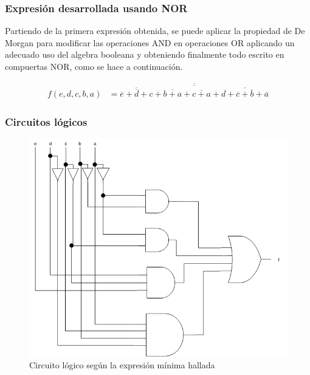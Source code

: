 \subsubsection{Expresión desarrollada usando NOR}
Partiendo de la primera expresi\'on obtenida, se puede aplicar la propiedad de De Morgan para modificar las operaciones AND en operaciones OR
aplicando un adecuado uso del algebra booleana y obteniendo finalmente todo escrito en compuertas NOR,
como se hace a continuaci\'on.

\begin{align*}
f(e,d,c,b,a) & = \overline{
    \overline{
            \overline{\overline{e} + \overline{d} + c}
            + \overline{b + a}
            + \overline{c + a}
            + \overline{d + \overline{c} + \overline{b} + \overline{a}}
            }
    }
\end{align*}

\subsubsection{Circuitos lógicos}

\begin{figure}[H]
    \centering
    \includegraphics[scale=0.5]{EJ_2/resources/ej_2_minterms_0.png}
    \caption{Circuito l\'ogico seg\'un la expresi\'on m\'inima hallada}
\end{figure}

